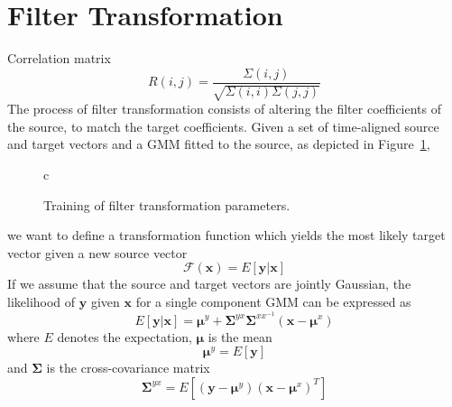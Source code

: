 \section{Filter Transformation} %
\label{the:conversion_function}
Correlation matrix
\begin{equation}
	R(i,j) = \frac{\Sigma(i,j)}{\sqrt{\Sigma(i,i)\Sigma(j,j)}}
\end{equation}
The process of filter transformation consists of altering the filter coefficients of the source, to match the target coefficients. Given a set of time-aligned source and target vectors and a GMM fitted to the source, as depicted in Figure~\ref{fig:VC_training}, 
\begin{figure}[htbp]
	\centering
	\begin{tabular}[h]{c}
	\end{tabular}
	\caption{Training of filter transformation parameters.}
	\label{fig:VC_training}
\end{figure}
we want to define a transformation function which yields the most likely target vector given a new source vector
\begin{equation}
	\mathcal{F}(\mathbf{x}) = E[\mathbf{y}\vert \mathbf{x}]
\end{equation}
If we assume that the source and target vectors are jointly Gaussian, the likelihood of $\mathbf{y}$ given $\mathbf{x}$ for a single component GMM can be expressed as \cite{kay93}
\begin{equation}
	E[\mathbf{y}\vert \mathbf{x}] = \boldsymbol{\mu}^y + \mathbf{\Sigma}^{yx} \mathbf{\Sigma}^{xx^{-1}} (\mathbf{x}-\boldsymbol{\mu}^x)
\end{equation}
where $E$ denotes the expectation, $\boldsymbol{\mu}$ is the mean
\begin{equation}
	\boldsymbol{\mu}^y = E[\mathbf{y}]
\end{equation}
and $\mathbf{\Sigma}$ is the cross-covariance matrix
\begin{equation}
	\mathbf{\Sigma}^{yx} = E[(\mathbf{y}-\boldsymbol{\mu}^y)(\mathbf{x}-\boldsymbol{\mu}^x)^T]
\end{equation}


